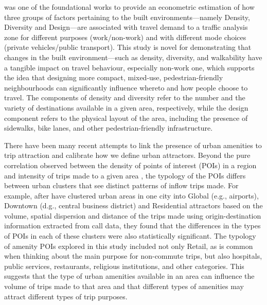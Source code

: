 \citet{cerveroTravelDemand3Ds1997} was one of the foundational works to provide an econometric estimation of how three groups of factors pertaining to the built environments---namely Density, Diversity and Design---are associated with travel demand to a traffic analysis zone for different purposes (work/non-work) and with different mode choices (private vehicles/public transport). This study is novel for demonstrating that changes in the built environment—such as density, diversity, and walkability have a tangible impact on travel behaviour, especially non-work one, which supports the idea that designing more compact, mixed-use, pedestrian-friendly neighbourhoods can significantly influence whereto and how people choose to travel. The components of density and diversity refer to the number and the variety of destinations available in a given area, respectively, while the design component refers to the physical layout of the area, including the presence of sidewalks, bike lanes, and other pedestrian-friendly infrastructure.

There have been many recent attempts to link the presence of urban amenities to trip attraction and calibrate how we define urban attractors. Beyond the pure correlation observed between the density of points of interest (POIs) in a region and intensity of trips made to a given area \citep{melikovCharacterizingUrbanMobility2021}, the typology of the POIs differs between urban clusters that see distinct patterns of inflow trips made. For example, after \citet{aaqibjavedEstimationTripAttraction2020} have clustered urban areas in one city into Global (e.g., airports), Downtown (d.g., central business district) and Residential attractors based on the volume, spatial dispersion and distance of the trips made using origin-destination information extracted from call data, they found that the differences in the types of POIs in each of these clusters were also statistically significant. The typology of amenity POIs explored in this study included not only Retail, as is common when thinking about the main purpose for non-commute trips, but also hospitals, public services, restaurants, religious institutions, and other categories. This suggests that the type of urban amenities available in an area can influence the volume of trips made to that area and that different types of amenities may attract different types of trip purposes.

